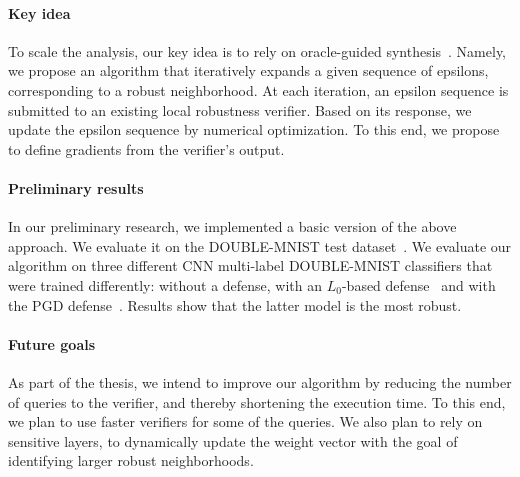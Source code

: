 \paragraph{Key idea} To scale the analysis, our key idea is to rely on oracle-guided synthesis~\cite{OracleGuided}.
Namely, we propose an algorithm that iteratively expands a given sequence of epsilons, corresponding to a robust neighborhood.
At each iteration, an epsilon sequence is submitted to an existing local robustness verifier. %
Based on its response, we update the epsilon sequence by numerical optimization.
To this end, we propose to define gradients from the verifier's output. %

\paragraph{Preliminary results}
In our preliminary research, we implemented a basic version of the above approach.
We evaluate it on the DOUBLE-MNIST test dataset~\cite{DoubleMNIST}.
We evaluate our algorithm on three different CNN multi-label DOUBLE-MNIST classifiers that were trained differently: without a defense, with an $L_0$-based defense~\cite{L0} and with the PGD defense~\cite{PGD}.
Results show that the latter model is the most robust. %
\paragraph{Future goals}
As part of the thesis, we intend to improve our algorithm by reducing the number of queries to the verifier, and thereby shortening the execution time.
To this end, we plan to use faster verifiers for some of the queries. %
We also plan to rely on sensitive layers, to dynamically update the weight vector with the goal of identifying larger robust neighborhoods. %

